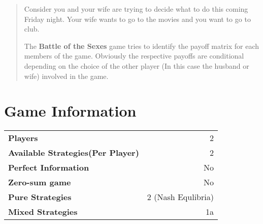 \documentclass[12pt,oneside]{amsart}
\begin{document}
   \author{David Coallier}
   
   \title[Battle of the Sexes]{}

   \begin{abstract}
    Consider you and your wife are trying to decide what to do
    this coming Friday night. Your wife wants to go to the movies
    and you want to go to club.

    The \textbf{Battle of the Sexes} game tries to identify the payoff matrix
    for each members of the game. Obviously the respective payoffs are 
    conditional depending on the choice of the other player (In this case
    the husband or wife) involved in the game.
   \end{abstract}


   \date{\today}

   \maketitle

   \section{Game Information}
    \begin{tabular}{l r}
     \textbf{Players}&2\\
     \textbf{Available Strategies(Per Player)}&2 \\
     \textbf{Perfect Information}&No \\
     \textbf{Zero-sum game}&No\\
     \textbf{Pure Strategies}&2 (Nash Equlibria)\\
     \textbf{Mixed Strategies}&1a
    \end{tabular}
\end{document}
